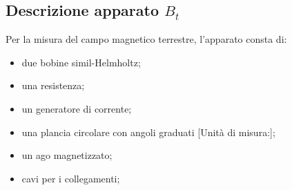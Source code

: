 \subsection{Descrizione apparato $B_t$}
Per la misura del campo magnetico terrestre, l'apparato consta di:
\begin{itemize}
\item due bobine simil-Helmholtz;
\item una resistenza;
\item un generatore di corrente;
\item una plancia circolare con angoli graduati [Unità di misura:];
\item un ago magnetizzato;
\item cavi per i collegamenti;
\end{itemize}
